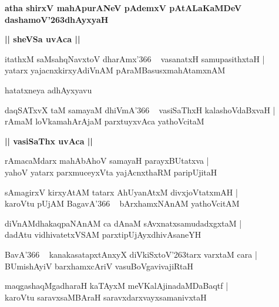 \documentclass[twoside,12pt,openright]{book}
\def\S{\char'263}
\newcounter{shloka}[chapter]
\def\uvaca#1{\centerline{{\large\textbf{#1}}}}
\begin{document}
\begin{center}
{\LARGE\bfseries atha shirxV mahApurANeV pAdemxV pAtALaKaMDeV dashamoV\S dhAyxyaH}
\end{center}

\uvaca{|| sheVSa uvAca ||}

\begin{shloka}%
itathxM saMsahqNavxtoV dharAmx\char'366 ~ vasanatxH samupasithxtaH |\\
yatarx yajacnxkirxyAdiVnAM pAraMBasusxmahAtamxnAM 
\end{shloka}

\begin{center}
hatatxneya adhAyxyavu
\end{center}

\begin{shloka}%
daqSATxvX taM samayaM dhiVmA\char'366 ~ vasiSaThxH kalashoVdaBxvaH |\\
rAmaM loVkamahArAjaM parxtuyxvAca yathoVcitaM 
\end{shloka}

\uvaca{|| vasiSaThx uvAca ||}

\begin{shloka}%
rAmacaMdarx mahAbAhoV samayaH parayxBUtatxva |\\
yahoV yatarx parxmuceyxVta yajAcnxthaRM paripUjitaH 
\end{shloka}

\begin{shloka}%
sAmagirxV kirxyAtAM tatarx AhUyanAtxM divxjoVtatxmAH |\\
karoVtu pUjAM BagavA\char'366 ~ bArxhamxNAnAM yathoVcitAM 
\end{shloka}

\begin{shloka}%
diVnAMdhakaqpaNAnAM ca dAnaM sAvxnatxsamudadxgxtaM |\\
dadAtu vidhivatetxVSAM parxtipUjAyxdhivAsaneYH
\end{shloka}

\begin{shloka}%
BavA\char'366 ~ kanakasatapxtAnxyX diVkiSxtoV\S tarx varxtaM cara |\\
BUmishAyiV barxhamxcAriV vasuBoVgavivajiRtaH 
\end{shloka}

\begin{shloka}%
maqgashaqMgadharaH kaTAyxM meVKalAjinadaMDaBaqtf |\\
karoVtu saravxsaMBAraH saravxdarxvayxsamanivxtaH
\end{shloka}
\end{document}
